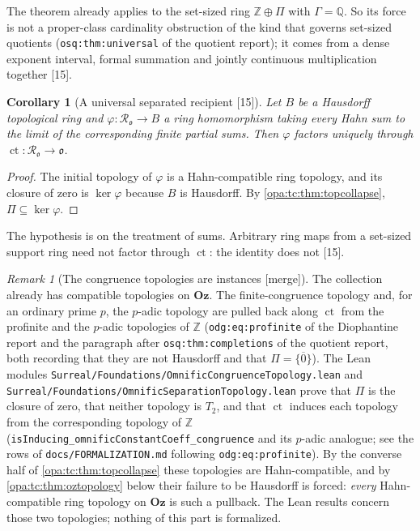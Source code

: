 \documentclass[11pt,oneside]{article}
\numberwithin{equation}{section}
\newtheorem{corollary}[corollary]{Corollary}
\theoremstyle{definition}
\theoremstyle{remark}
\newtheorem{remark}[remark]{Remark}
\newcommand{\Oz}{\mathbf{Oz}}
\newcommand{\Q}{\mathbb Q}
\newcommand{\Z}{\mathbb Z}
\newcommand{\oo}{\mathfrak o}
\newcommand{\Ro}{\mathcal R_{\oo}}
\newcommand{\ct}{\operatorname{ct}}
\newcommand{\src}[1]{\textup{\textsf{\small[#1]}}}
\newcommand{\mergetag}{\textup{\textsf{\small[merge]}}}
\newcommand{\lbl}[1]{\nolinkurl{#1}}
\newcommand{\fn}[1]{\nolinkurl{#1}}
\begin{document}
The theorem already applies to the set-sized ring $\Z\oplus\Pi$ with $\Gamma=\Q$. So its force is not
a proper-class cardinality obstruction of the kind that governs set-sized quotients
(\lbl{osq:thm:universal} of the quotient report); it comes from a dense exponent interval, formal
summation and jointly continuous multiplication together \src{15}.

\begin{corollary}[A universal separated recipient \src{15}]\label{opa:tc:cor:toprecipient}
Let $B$ be a Hausdorff topological ring and $\varphi:\Ro\to B$ a ring homomorphism taking every Hahn sum
to the limit of the corresponding finite partial sums. Then $\varphi$ factors uniquely through
$\ct:\Ro\to\oo$.
\end{corollary}
\begin{proof}
The initial topology of $\varphi$ is a Hahn-compatible ring topology, and its closure of zero is
$\ker\varphi$ because $B$ is Hausdorff. By \cref{opa:tc:thm:topcollapse}, $\Pi\subseteq\ker\varphi$.
\end{proof}

The hypothesis is on the treatment of sums. Arbitrary ring maps from a set-sized support ring need not
factor through $\ct$: the identity does not \src{15}.

\begin{remark}[The congruence topologies are instances \mergetag]\label{opa:tc:rem:congruence}
The collection already has compatible topologies on $\Oz$. The finite-congruence topology and, for an
ordinary prime $p$, the $p$-adic topology are pulled back along $\ct$ from the profinite and the
$p$-adic topologies of $\Z$ (\lbl{odg:eq:profinite} of the Diophantine report and the paragraph after
\lbl{osq:thm:completions} of the quotient report, both recording that they are not Hausdorff and that
$\Pi=\overline{\{0\}}$). The Lean modules \fn{Surreal/Foundations/OmnificCongruenceTopology.lean} and
\fn{Surreal/Foundations/OmnificSeparationTopology.lean} prove that $\Pi$ is the closure of zero, that
neither topology is $T_2$, and that $\ct$ induces each topology from the corresponding topology of $\Z$
(\texttt{isInducing\_omnificConstantCoeff\_congruence} and its $p$-adic analogue; see the rows of
\fn{docs/FORMALIZATION.md} following \lbl{odg:eq:profinite}). By the converse half of
\cref{opa:tc:thm:topcollapse} these topologies are Hahn-compatible, and by
\cref{opa:tc:thm:oztopology} below their failure to be Hausdorff is forced: \emph{every} Hahn-compatible
ring topology on $\Oz$ is such a pullback. The Lean results concern those two topologies; nothing of
this part is formalized.
\end{remark}
\end{document}

